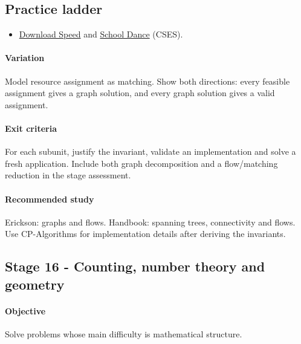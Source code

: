 \documentclass[11pt,letterpaper]{article}
\begin{document}
\subsection*{Practice ladder}

\begin{itemize}

\item \href{https://cses.fi/problemset/task/1694}{Download Speed} and \href{https://cses.fi/problemset/task/1696}{School Dance} (CSES).

\end{itemize}

\paragraph*{Variation}

Model resource assignment as matching. Show both directions: every feasible assignment gives a graph solution, and every graph solution gives a valid assignment.

\paragraph*{Exit criteria}

For each subunit, justify the invariant, validate an implementation and solve a fresh application. Include both graph decomposition and a flow/matching reduction in the stage assessment.

\paragraph*{Recommended study}

Erickson: graphs and flows. Handbook: spanning trees, connectivity and flows. Use CP-Algorithms for implementation details after deriving the invariants.

\par{}
\begin{samepage}
\section{Stage 16 - Counting, number theory and geometry}\label{sec:20}

\label{stage:16}


\paragraph*{Objective}

Solve problems whose main difficulty is mathematical structure.

\end{samepage}
\end{document}
